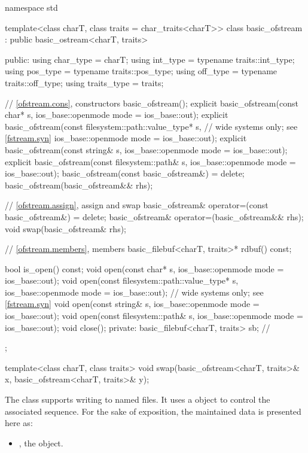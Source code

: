 %
\begin{codeblock}
namespace std {
  template<class charT, class traits = char_traits<charT>>
  class basic_ofstream : public basic_ostream<charT, traits> {
  public:
    using char_type   = charT;
    using int_type    = typename traits::int_type;
    using pos_type    = typename traits::pos_type;
    using off_type    = typename traits::off_type;
    using traits_type = traits;

    // \ref{ofstream.cons}, constructors
    basic_ofstream();
    explicit basic_ofstream(const char* s,
                            ios_base::openmode mode = ios_base::out);
    explicit basic_ofstream(const filesystem::path::value_type* s,  // wide systems only; see \ref{fstream.syn}
                            ios_base::openmode mode = ios_base::out);
    explicit basic_ofstream(const string& s,
                            ios_base::openmode mode = ios_base::out);
    explicit basic_ofstream(const filesystem::path& s,
                            ios_base::openmode mode = ios_base::out);
    basic_ofstream(const basic_ofstream&) = delete;
    basic_ofstream(basic_ofstream&& rhs);

    // \ref{ofstream.assign}, assign and swap
    basic_ofstream& operator=(const basic_ofstream&) = delete;
    basic_ofstream& operator=(basic_ofstream&& rhs);
    void swap(basic_ofstream& rhs);

    // \ref{ofstream.members}, members
    basic_filebuf<charT, traits>* rdbuf() const;

    bool is_open() const;
    void open(const char* s, ios_base::openmode mode = ios_base::out);
    void open(const filesystem::path::value_type* s,
              ios_base::openmode mode = ios_base::out);     // wide systems only; see \ref{fstream.syn}
    void open(const string& s, ios_base::openmode mode = ios_base::out);
    void open(const filesystem::path& s, ios_base::openmode mode = ios_base::out);
    void close();
  private:
    basic_filebuf<charT, traits> sb;    // \expos
  };

  template<class charT, class traits>
    void swap(basic_ofstream<charT, traits>& x,
              basic_ofstream<charT, traits>& y);
}
\end{codeblock}

\pnum
The class
supports writing to named files.
It uses a
object to control the associated
sequence.
For the sake of exposition, the maintained data is presented here as:
\begin{itemize}
\item
{}, the  object.
\end{itemize}

